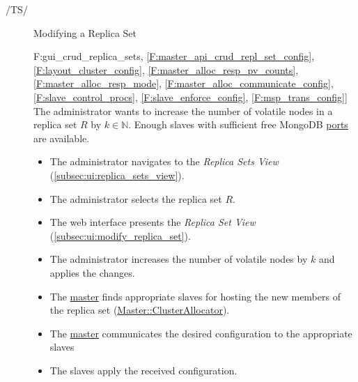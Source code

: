 \documentclass[a4paper, 11pt]{article}
\makeatletter
\def\namedlabel#1#2{\begingroup
    #2%
    \def\@currentlabel{#2}%
    \phantomsection\label{#1}\endgroup
}
\newcommand{\oitem}[2]{
  \@ifundefined{c@oitem#1}{\newcounter{oitem#1}}{} %
  \addtocounter{oitem#1}{10}
  \item[\namedlabel{#1:#2}{/#1\arabic{oitem#1}/}]
}
\newcommand{\testsequence}[3][]{
	\begin{description}[leftmargin=!,labelwidth=\widthof{\bfseries Preconditions}]
		\ifthenelse{\equal{#1}{}}
		{} %
		{\item[Tests] #1}
		\item[Preconditions] #2
		\item[Steps] #3
	\end{description}
}
\makeatother
\begin{document}
\begin{description}
\oitem{TS}{} Modifying a Replica Set
\testsequence
[\ref{F:gui_crud_replica_sets}, \ref{F:master_api_crud_repl_set_config}, \ref{F:layout_cluster_config}, \ref{F:master_alloc_resp_pv_counts}, \ref{F:master_alloc_resp_mode}, \ref{F:master_alloc_communicate_config}, \ref{F:slave_control_procs}, \ref{F:slave_enforce_config}, \ref{F:msp_trans_config}]
{
	The \gls{administrator} wants to increase the number of volatile nodes in a replica set $R$ by $k \in \mathbb{N}$. Enough \glspl{slave} with sufficient free \gls{MongoDB} \hyperref[D:slave_mongod_portrange]{ports} are available.
}
{
	\begin{itemize}
		\item The \gls{administrator} navigates to the \textit{Replica Sets View} (\ref{subsec:ui:replica_sets_view}).
		\item The \gls{administrator} selects the replica set $R$.
		\item The web interface presents the \textit{Replica Set View} (\ref{subsec:ui:modify_replica_set}).
		\item The \gls{administrator} increases the number of volatile nodes by $k$ and applies the changes.
		\item The \hyperref[SM:Master]{master} finds appropriate \glspl{slave} for hosting the new members of the replica set (\hyperref[SM:master_clusterallocator]{Master::ClusterAllocator}).
		\item The \hyperref[SM:Master]{master} communicates the desired configuration to the appropriate \glspl{slave}
		\item The \glspl{slave} apply the received configuration.
	\end{itemize}
}



\end{description}
\end{document}
